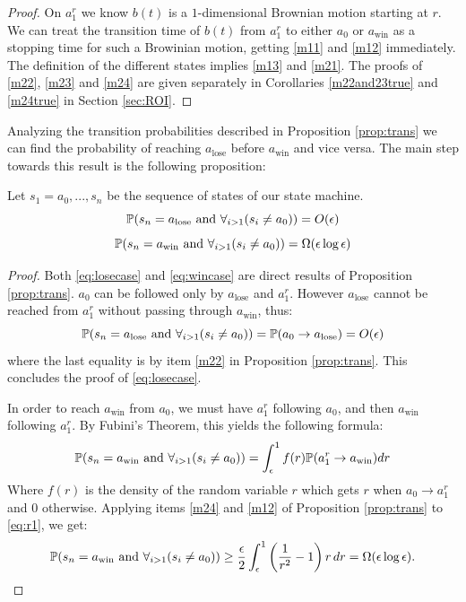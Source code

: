 {{\begin{proof}
 On $a^r_1$ we know $b(t)$ is a $1$-dimensional Brownian motion starting at $r$.
 We can treat the transition time of $b(t)$ from $a^r_1$ to either $a_0$ or
 $a_\text{win}$ as a stopping time for such a Browinian motion, getting
 \ref{m11} and \ref{m12} immediately. The definition of the different states
 implies \ref{m13} and \ref{m21}. The proofs of \ref{m22}, \ref{m23} and \ref{m24}
 are given separately in Corollaries \ref{m22and23true} and \ref{m24true} in Section \ref{sec:ROI}.
\end{proof}

Analyzing the transition probabilities described in Proposition \ref{prop:trans} we
can find the probability of reaching $a_\text{lose}$ before $a_\text{win}$ and vice versa.
 The main step towards this result is the following proposition:

\begin{propos}\label{prop:winlose1}
Let $s_1=a_0,...,s_n$ be the sequence of states of our state machine.
\begin{equation}\label{eq:losecase}
\mathbb{P}(s_n=a_\text{lose} \text{ and } \displaystyle\forall_{i>1}(s_i\neq a_0))=O(\epsilon)
\end{equation}
\begin{equation}\label{eq:wincase}
\mathbb{P}(s_n=a_\text{win} \text{ and } \displaystyle\forall_{i>1}(s_i\neq a_0))=\Omega(\epsilon\log\epsilon)
\end{equation}
\end{propos}

\begin{proof}
Both \eqref{eq:losecase} and \eqref{eq:wincase} are direct results of Proposition \ref{prop:trans}.
 $a_0$ can be followed only by $a_\text{lose}$ and $a_1^r$. However $a_\text{lose}$ cannot be
 reached from $a_1^r$ without passing through
 $a_\text{win}$, thus:
 $$\mathbb{P}(s_n=a_\text{lose} \text{ and } \displaystyle\forall_{i>1}(s_i\neq a_0))=\mathbb{P}(a_0\rightarrow a_\text{lose})=O(\epsilon)$$
 where the last equality is by item \ref{m22} in Proposition \ref{prop:trans}.
 This concludes the proof of \eqref{eq:losecase}.

 In order to reach $a_\text{win}$ from $a_0$, we must have $a_1^r$ following $a_0$, and then $a_\text{win}$
  following $a_1^r$. By Fubini's Theorem, this yields the following formula:
 \begin{equation}\label{eq:r1}
 \mathbb{P}(s_n=a_\text{win} \text{ and } \displaystyle\forall_{i>1}(s_i\neq a_0))=\displaystyle\int_{\epsilon}^1 f(r) \mathbb{P}(a^r_1\rightarrow a_\text{win}) dr
 \end{equation}
 Where $f(r)$ is the density of the random variable $r$ which gets $r$ when
 $a_0\rightarrow a^r_1$ and $0$ otherwise.
 Applying items \ref{m24} and \ref{m12} of Proposition \ref{prop:trans} to \eqref{eq:r1}, we get:
\begin{equation}\label{eq:r3}
 \mathbb{P}(s_n=a_\text{win} \text{ and } \displaystyle\forall_{i>1}(s_i\neq a_0))\ge \frac{\epsilon}{2} \int_{\epsilon}^{1} \left(\frac{1}{r^2}-1\right) r \, dr = \Omega(\epsilon\log\epsilon).
\end{equation}
\end{proof}

}}
